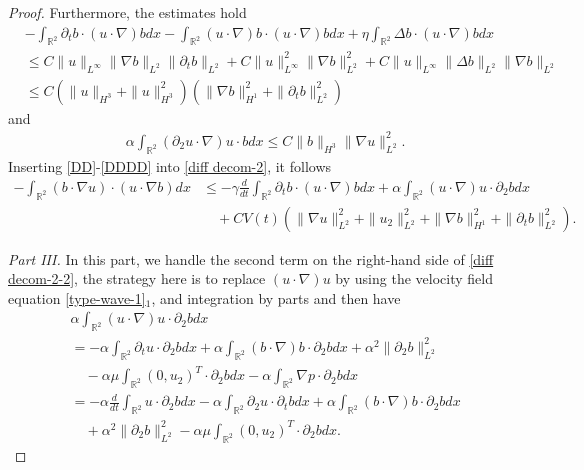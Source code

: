 \documentclass[10pt,a4paper]{amsart}
\def\R{\mathbb R}
\begin{document}
\begin{proof}
Furthermore, the estimates hold
\begin{align}\label{DDD}
&-\int_{\R^2}\partial_{t}b\cdot (u\cdot\nabla) bdx-\int_{\R^2}(u\cdot\nabla) b\cdot (u\cdot\nabla) bdx+\eta\int_{\R^2}\Delta b\cdot (u\cdot\nabla) bdx\nonumber\\
&\leq
C\|u\|_{L^\infty}\|\nabla b\|_{L^2}\|\partial_tb\|_{L^2}+C\|u\|_{L^\infty}^2\|\nabla b\|_{L^2}^2+C\|u\|_{L^\infty}\|\Delta b\|_{L^2}\|\nabla b\|_{L^2}\nonumber\\
&\leq C(\|u\|_{H^3}+\|u\|_{H^3}^2)\left(\|\nabla b\|_{H^1}^2+\|\partial_tb\|_{L^2}^2\right)
\end{align}
and
\begin{align}\label{DDDD}
&\alpha\int_{\R^2}(\partial_2u\cdot \nabla) u\cdot b dx
\leq C\|b\|_{H^{3}}\|\nabla u\|_{L^{2}}^2.
\end{align}
Inserting \eqref{DD}-\eqref{DDDD} into \eqref{diff decom-2}, it follows
\begin{align}\label{diff decom-2-2}
-\int_{\R^2}(b\cdot \nabla u)\cdot(u\cdot \nabla b)dx
&\leq-\gamma\frac{d}{dt}\int_{\R^2}\partial_{t}b\cdot (u\cdot\nabla) bdx+\alpha\int_{\R^2}(u\cdot \nabla) u\cdot\partial_2 bdx\nonumber\\
&\quad +CV(t)\left(\|\nabla u\|_{L^{2}}^2+\|u_2\|_{L^2}^2+\|\nabla b\|_{H^1}^2+\|\partial_tb\|_{L^{2}}^2\right).
\end{align}

{\it {Part III.}} In this part, we  handle the second term on the right-hand side of \eqref{diff decom-2-2}, the strategy here is to replace $(u\cdot \nabla) u$ by using the velocity field equation \eqref{type-wave-1}$_1$, and integration by parts and then have \begin{align*}
&\alpha\int_{\R^2}(u\cdot \nabla)u\cdot\partial_2 bdx\nonumber\\
&=-\alpha\int_{\R^2}\partial_tu\cdot\partial_2 bdx+\alpha\int_{\R^2}(b\cdot\nabla )b\cdot\partial_2 bdx+\alpha^2\|\partial_2b\|_{L^2}^2\nonumber\\
&\quad-\alpha\mu\int_{\R^2}(0,u_2)^{T}\cdot\partial_2 bdx-\alpha\int_{\R^2}\nabla p\cdot\partial_2 bdx\nonumber\\
&=-\alpha\frac{d}{dt}\int_{\R^2}u\cdot\partial_2 bdx-\alpha\int_{\R^2}\partial_2u\cdot\partial_t bdx+\alpha\int_{\R^2}(b\cdot\nabla) b\cdot\partial_2 bdx\nonumber\\
&\quad+\alpha^2\|\partial_2b\|_{L^2}^2-\alpha\mu\int_{\R^2}(0,u_2)^{T}\cdot\partial_2 bdx.
\end{align*}



\end{proof}
\end{document}
